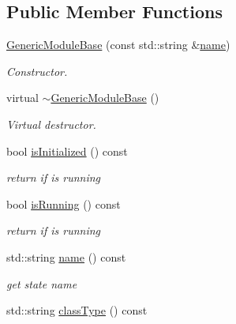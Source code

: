 \subsection*{Public Member Functions}
\begin{DoxyCompactItemize}
\item 
\hyperlink{classow_1_1GenericModuleBase_acdbc9380752e797b3093d6f5fb506b76}{Generic\+Module\+Base} (const std\+::string \&\hyperlink{classow_1_1GenericModuleBase_a4b712883728cdbab7779e27f9a23689c}{name})\hypertarget{classow_1_1GenericModuleBase_acdbc9380752e797b3093d6f5fb506b76}{}\label{classow_1_1GenericModuleBase_acdbc9380752e797b3093d6f5fb506b76}

\begin{DoxyCompactList}\small\item\em Constructor. \end{DoxyCompactList}\item 
virtual \hyperlink{classow_1_1GenericModuleBase_a9bcecd007b2665363ab0e3e6ac03c60f}{$\sim$\+Generic\+Module\+Base} ()\hypertarget{classow_1_1GenericModuleBase_a9bcecd007b2665363ab0e3e6ac03c60f}{}\label{classow_1_1GenericModuleBase_a9bcecd007b2665363ab0e3e6ac03c60f}

\begin{DoxyCompactList}\small\item\em Virtual destructor. \end{DoxyCompactList}\item 
bool \hyperlink{classow_1_1GenericModuleBase_aef59a4b0b68ee9ba0b6cc9fe1ac910bd}{is\+Initialized} () const 
\begin{DoxyCompactList}\small\item\em return if is running \end{DoxyCompactList}\item 
bool \hyperlink{classow_1_1GenericModuleBase_a1450a5878a6791751434518e65be8665}{is\+Running} () const 
\begin{DoxyCompactList}\small\item\em return if is running \end{DoxyCompactList}\item 
std\+::string \hyperlink{classow_1_1GenericModuleBase_a4b712883728cdbab7779e27f9a23689c}{name} () const \hypertarget{classow_1_1GenericModuleBase_a4b712883728cdbab7779e27f9a23689c}{}\label{classow_1_1GenericModuleBase_a4b712883728cdbab7779e27f9a23689c}

\begin{DoxyCompactList}\small\item\em get state name \end{DoxyCompactList}\item 
std\+::string \hyperlink{classow_1_1GenericModuleBase_ac5d1344fc2d1ab4a67dffa262a48428a}{class\+Type} () const \hypertarget{classow_1_1GenericModuleBase_ac5d1344fc2d1ab4a67dffa262a48428a}{}\label{classow_1_1GenericModuleBase_ac5d1344fc2d1ab4a67dffa262a48428a}


\end{DoxyCompactItemize}
